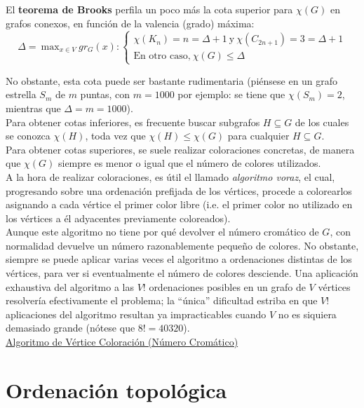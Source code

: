 El \textbf{teorema de Brooks} perfila un poco más la cota superior para $\chi (G)$ en grafos conexos, en función de la valencia (grado) máxima:
\[ \Delta =\ \mbox{max}_{x \in V}\ gr_G(x):
\left\{ 
\begin{array}{l}
\chi (K_n) = n = \Delta + 1\ \mbox{y}\ \chi (C_{2n + 1}) = 3 = \Delta + 1 \\
\mbox{En otro caso,}\ \chi (G) \leq \Delta
\end{array}
\right. \]

No obstante, esta cota puede ser bastante rudimentaria (piénsese en un grafo estrella $S_m$ de $m$ puntas, con $m = 1000$ por ejemplo: se tiene que $\chi (S_m) = 2$, mientras que $\Delta = m = 1000$).\\

Para obtener cotas inferiores, es frecuente buscar subgrafos $H \subseteq G$ de los cuales se conozca $\chi (H)$, toda vez que $\chi (H) \leq \chi (G)$ para cualquier $H \subseteq G$.\\

Para obtener cotas superiores, se suele realizar coloraciones concretas, de manera que $\chi (G)$ siempre es menor o igual que el número de colores utilizados.\\

A la hora de realizar coloraciones, es útil el llamado \emph{algoritmo voraz}, el cual, progresando sobre una ordenación prefijada de los vértices, procede a colorearlos asignando a cada vértice el primer color libre (i.e. el primer color no utilizado en los vértices a él adyacentes previamente coloreados).\\

Aunque este algoritmo no tiene por qué devolver el número cromático de $G$, con normalidad devuelve un número razonablemente pequeño de colores. No obstante, siempre se puede aplicar varias veces el algoritmo a ordenaciones distintas de los vértices, para ver si eventualmente el número de colores desciende. Una aplicación exhaustiva del algoritmo a las $V!$ ordenaciones posibles en un grafo de $V$ vértices resolvería efectivamente el problema; la ``única'' dificultad estriba en que $V!$ aplicaciones del algoritmo resultan ya impracticables cuando $V$ no es siquiera demasiado grande (nótese que $8! = 40320$).\\

\underline{Algoritmo de Vértice Coloración (Número Cromático)}\\


\section{Ordenación topológica}
\label{sec:topologico}

